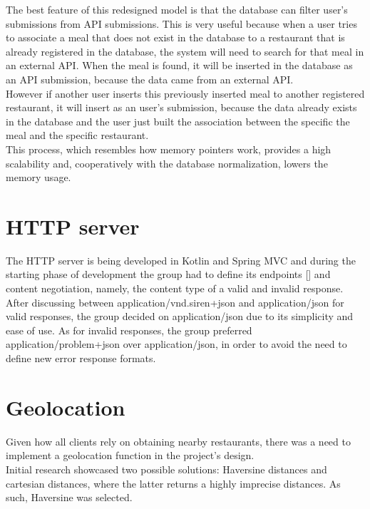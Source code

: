 The best feature of this redesigned model is that the database can filter user's submissions from API submissions. This is very
useful because when a user tries to associate a meal that does not exist in the database to a restaurant that is already registered
in the database, the system will need to search for that meal in an external API. When the meal is found, it will be inserted in the database
as an API submission, because the data came from an external API.\\

However if another user inserts this previously inserted meal to another registered restaurant, it will insert as an user's submission, because
the data already exists in the database and the user just built the association between the specific the meal and the specific restaurant.\\

This process, which resembles how memory pointers work, provides a high scalability and, cooperatively with the database normalization, lowers the memory usage.\\

\section{HTTP server}

The HTTP server is being developed in Kotlin and Spring MVC and during the starting phase of development the group had to define its endpoints [] 
and content negotiation, namely, the content type of a valid and invalid response.\\

After discussing between application/vnd.siren+json and application/json for valid responses, the group decided on application/json due to its simplicity and ease of use.
As for invalid responses, the group preferred application/problem+json over application/json, in order to avoid the need to define new error response formats.\\

\section{Geolocation}

Given how all clients rely on obtaining nearby restaurants, there was a need to implement a geolocation function in the project's design.\\

Initial research showcased two possible solutions: Haversine distances and cartesian distances, where the latter returns a highly imprecise distances.
As such, Haversine was selected.\\

